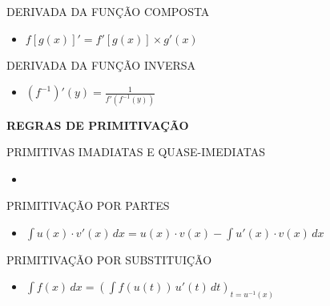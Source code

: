 \documentclass[twocolumn, 10pt]{article}
\begin{document}
\vspace{8pt}
\MakeUppercase{Derivada da Função Composta}

\begin{itemize}[topsep=2pt]
    \item $f\left[g(x)\right]' = f'\left[g(x)\right] \times g'(x) $
\end{itemize}

\vspace{8pt}
\MakeUppercase{Derivada da Função Inversa}

\begin{itemize}[topsep=2pt]
    \item $\displaystyle \left(f^{-1}\right)'(y) = \frac{1}{f'\left(f^{-1}(y)\right)}$
\end{itemize}

\newpage

\MakeUppercase{\textbf{\Large Regras de Primitivação}}

\vspace{8pt}
\MakeUppercase{Primitivas Imadiatas e Quase-Imediatas}

\begin{itemize}[topsep=2pt]
    \item 
\end{itemize}

\vspace{8pt}
\MakeUppercase{Primitivação por partes}

\begin{itemize}[topsep=2pt]
    \item $\displaystyle \int u(x)\cdot v'(x)\,dx = u(x) \cdot v(x) - \int u'(x) \cdot v(x)\,dx$
\end{itemize}

\vspace{8pt}
\MakeUppercase{Primitivação por substituição}

\begin{itemize}
    \item $\displaystyle \int f(x)\,dx = \left(\int f(u(t))\,u'(t)\,dt\right)_{t=u^{-1}(x)}$
\end{itemize}
\end{document}
